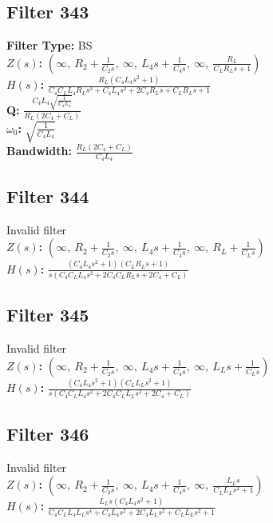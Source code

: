 \documentclass{article}
\begin{document}
\subsection*{Filter 343}
\textbf{Filter Type:} BS \\ 
\textbf{$Z(s)$:} $\left( \infty, \  R_{2} + \frac{1}{C_{2} s}, \  \infty, \  L_{4} s + \frac{1}{C_{4} s}, \  \infty, \  \frac{R_{L}}{C_{L} R_{L} s + 1}\right)$ \\ 
\textbf{$H(s)$:} $\frac{R_{L} \left(C_{4} L_{4} s^{2} + 1\right)}{C_{4} C_{L} L_{4} R_{L} s^{3} + C_{4} L_{4} s^{2} + 2 C_{4} R_{L} s + C_{L} R_{L} s + 1}$ \\ 
\textbf{Q:} $\frac{C_{4} L_{4} \sqrt{\frac{1}{C_{4} L_{4}}}}{R_{L} \left(2 C_{4} + C_{L}\right)}$ \\ 
\textbf{$\omega_0$:} $\sqrt{\frac{1}{C_{4} L_{4}}}$ \\ 
\textbf{Bandwidth:} $\frac{R_{L} \left(2 C_{4} + C_{L}\right)}{C_{4} L_{4}}$ \\ 
\subsection*{Filter 344}
Invalid filter \\ 
\textbf{$Z(s)$:} $\left( \infty, \  R_{2} + \frac{1}{C_{2} s}, \  \infty, \  L_{4} s + \frac{1}{C_{4} s}, \  \infty, \  R_{L} + \frac{1}{C_{L} s}\right)$ \\ 
\textbf{$H(s)$:} $\frac{\left(C_{4} L_{4} s^{2} + 1\right) \left(C_{L} R_{L} s + 1\right)}{s \left(C_{4} C_{L} L_{4} s^{2} + 2 C_{4} C_{L} R_{L} s + 2 C_{4} + C_{L}\right)}$ \\ 
\subsection*{Filter 345}
Invalid filter \\ 
\textbf{$Z(s)$:} $\left( \infty, \  R_{2} + \frac{1}{C_{2} s}, \  \infty, \  L_{4} s + \frac{1}{C_{4} s}, \  \infty, \  L_{L} s + \frac{1}{C_{L} s}\right)$ \\ 
\textbf{$H(s)$:} $\frac{\left(C_{4} L_{4} s^{2} + 1\right) \left(C_{L} L_{L} s^{2} + 1\right)}{s \left(C_{4} C_{L} L_{4} s^{2} + 2 C_{4} C_{L} L_{L} s^{2} + 2 C_{4} + C_{L}\right)}$ \\ 
\subsection*{Filter 346}
Invalid filter \\ 
\textbf{$Z(s)$:} $\left( \infty, \  R_{2} + \frac{1}{C_{2} s}, \  \infty, \  L_{4} s + \frac{1}{C_{4} s}, \  \infty, \  \frac{L_{L} s}{C_{L} L_{L} s^{2} + 1}\right)$ \\ 
\textbf{$H(s)$:} $\frac{L_{L} s \left(C_{4} L_{4} s^{2} + 1\right)}{C_{4} C_{L} L_{4} L_{L} s^{4} + C_{4} L_{4} s^{2} + 2 C_{4} L_{L} s^{2} + C_{L} L_{L} s^{2} + 1}$ \\ 
\end{document}
